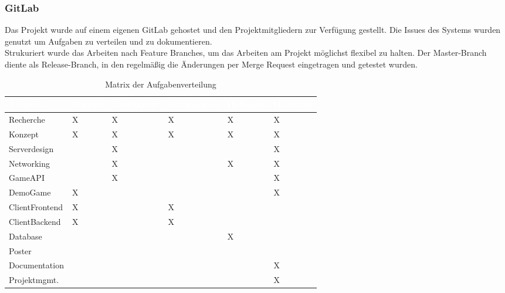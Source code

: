 \documentclass[a4paper]{spie}  %
\begin{document}
\subsubsection{GitLab}
Das Projekt wurde auf einem eigenen GitLab gehostet und den Projektmitgliedern zur Verfügung gestellt. Die Issues des Systems wurden genutzt um Aufgaben zu verteilen und zu dokumentieren.
\\
Strukuriert wurde das Arbeiten nach Feature Branches, um das Arbeiten am Projekt möglichst flexibel zu halten. Der Master-Branch diente als Release-Branch, in den regelmäßig die Änderungen per Merge Request eingetragen und getestet wurden.
\begin{table}
	\label{table:Aufgabenverteilung}
	\centering
		\caption{Matrix der Aufgabenverteilung}
		\begin{tabular}{| L{2.6cm} | C{2cm} | C{2cm} | C{2cm} | C{2cm} | C{2cm} |}
		\hline
		\textcolor{white}{\textbf{Aufgabe}} & \textcolor{white}{\textbf{Schleiss}} & \textcolor{white}{\textbf{Grothknopf}} & \textcolor{white}{\textbf{Schiwkowksi}} & \textcolor{white}{\textbf{Hofmann}} & \textcolor{white}{\textbf{Heinrichs}}\\\hline
		Recherche 		& X & X	& X	& X	& X	\\\hline
		Konzept 		& X & X	& X	& X	& X	\\\hline
		Serverdesign	& 	& X & 	& 	& X \\\hline
		Networking		& 	& X	& 	& X	& X	\\\hline
		GameAPI 		& 	& X	&	&	& X	\\\hline
		DemoGame 		& X	&	&	&	& X	\\\hline
		ClientFrontend 	& X	&	& X	&	&	\\\hline
		ClientBackend 	& X	&	& X	&	&	\\\hline
		Database 	    & 	&	&	& X	& 	\\\hline
		Poster          & 	& 	& 	& 	& 	\\\hline
		Documentation   & 	& 	& 	& 	& X \\\hline
		Projektmgmt. 	&	&	&	& 	& X	\\\hline
	\end{tabular}
\end{table}
\end{document}

